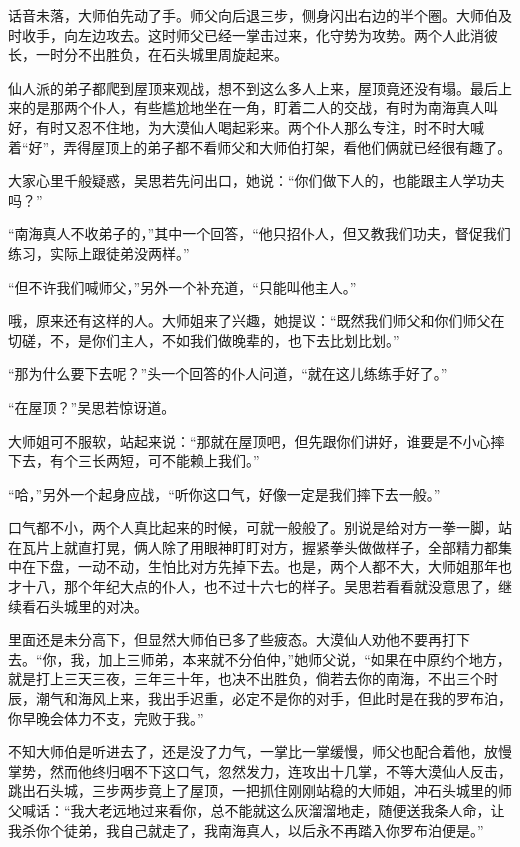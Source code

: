 话音未落，大师伯先动了手。师父向后退三步，侧身闪出右边的半个圈。大师伯及时收手，向左边攻去。这时师父已经一掌击过来，化守势为攻势。两个人此消彼长，一时分不出胜负，在石头城里周旋起来。

仙人派的弟子都爬到屋顶来观战，想不到这么多人上来，屋顶竟还没有塌。最后上来的是那两个仆人，有些尴尬地坐在一角，盯着二人的交战，有时为南海真人叫好，有时又忍不住地，为大漠仙人喝起彩来。两个仆人那么专注，时不时大喊着“好”，弄得屋顶上的弟子都不看师父和大师伯打架，看他们俩就已经很有趣了。

大家心里千般疑惑，吴思若先问出口，她说：“你们做下人的，也能跟主人学功夫吗？”

“南海真人不收弟子的，”其中一个回答，“他只招仆人，但又教我们功夫，督促我们练习，实际上跟徒弟没两样。”

“但不许我们喊师父，”另外一个补充道，“只能叫他主人。”

哦，原来还有这样的人。大师姐来了兴趣，她提议：“既然我们师父和你们师父在切磋，不，是你们主人，不如我们做晚辈的，也下去比划比划。”

“那为什么要下去呢？”头一个回答的仆人问道，“就在这儿练练手好了。”

“在屋顶？”吴思若惊讶道。

大师姐可不服软，站起来说：“那就在屋顶吧，但先跟你们讲好，谁要是不小心摔下去，有个三长两短，可不能赖上我们。”

“哈，”另外一个起身应战，“听你这口气，好像一定是我们摔下去一般。”

口气都不小，两个人真比起来的时候，可就一般般了。别说是给对方一拳一脚，站在瓦片上就直打晃，俩人除了用眼神盯盯对方，握紧拳头做做样子，全部精力都集中在下盘，一动不动，生怕比对方先掉下去。也是，两个人都不大，大师姐那年也才十八，那个年纪大点的仆人，也不过十六七的样子。吴思若看看就没意思了，继续看石头城里的对决。

里面还是未分高下，但显然大师伯已多了些疲态。大漠仙人劝他不要再打下去。“你，我，加上三师弟，本来就不分伯仲，”她师父说，“如果在中原约个地方，就是打上三天三夜，三年三十年，也决不出胜负，倘若去你的南海，不出三个时辰，潮气和海风上来，我出手迟重，必定不是你的对手，但此时是在我的罗布泊，你早晚会体力不支，完败于我。”

不知大师伯是听进去了，还是没了力气，一掌比一掌缓慢，师父也配合着他，放慢掌势，然而他终归咽不下这口气，忽然发力，连攻出十几掌，不等大漠仙人反击，跳出石头城，三步两步竟上了屋顶，一把抓住刚刚站稳的大师姐，冲石头城里的师父喊话：“我大老远地过来看你，总不能就这么灰溜溜地走，随便送我条人命，让我杀你个徒弟，我自己就走了，我南海真人，以后永不再踏入你罗布泊便是。”

